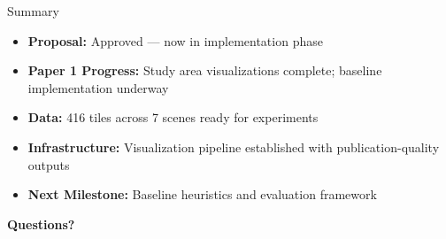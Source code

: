 \documentclass[10pt,xcolor={table,dvipsnames},t]{beamer}
\begin{document}
\begin{frame}{Summary}

\begin{itemize}
  \item \textbf{Proposal:} Approved --- now in implementation phase

  \vspace{0.5em}
  \item \textbf{Paper 1 Progress:} Study area visualizations complete; baseline implementation underway

  \vspace{0.5em}
  \item \textbf{Data:} 416 tiles across 7 scenes ready for experiments

  \vspace{0.5em}
  \item \textbf{Infrastructure:} Visualization pipeline established with publication-quality outputs

  \vspace{0.5em}
  \item \textbf{Next Milestone:} Baseline heuristics and evaluation framework
\end{itemize}

\vspace{1em}
\centering
\textbf{Questions?}

\end{frame}
\end{document}

